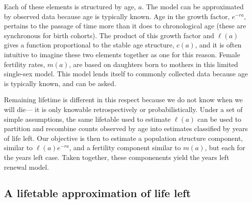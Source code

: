 \documentclass[12pt,oneside,a4paper,leqno]{article}
\begin{document}
Each of these elements is structured by
age, $a$. The model can be approximated by observed data because
age is typically known.%
Age in the growth factor, $e^{-ra}$, pertains to the passage of
time more than it does to chronological age (these are synchronous for birth
cohorts). The product of this growth factor and $\ell(a)$ gives a
function proportional to the stable age structure, $c(a)$, and it is often
intuitive to imagine these two elements together as one for this reason. Female
fertility rates, $m(a)$, are based on daughters born to mothers in this limited
single-sex model. This model lends itself to commonly collected data because age
is typically known, and can be asked.

Remaining lifetime is different in this respect because we do not know when we
will die--- it is only knowable retrospectively or probabilistically. Under a set of simple assumptions, the same lifetable used to
estimate $\ell(a)$ can be used to
partition and recombine counts observed by age into estimates
classified by years of life left. Our objective is then to estimate a population
structure component, similar to $\ell(a)e^{-ra}$, and a fertility component
similar to $m(a)$, but each for the years left case. Taken together, these
componenents yield the years left renewal model.

\subsection*{A lifetable approximation of life left}
\end{document}
